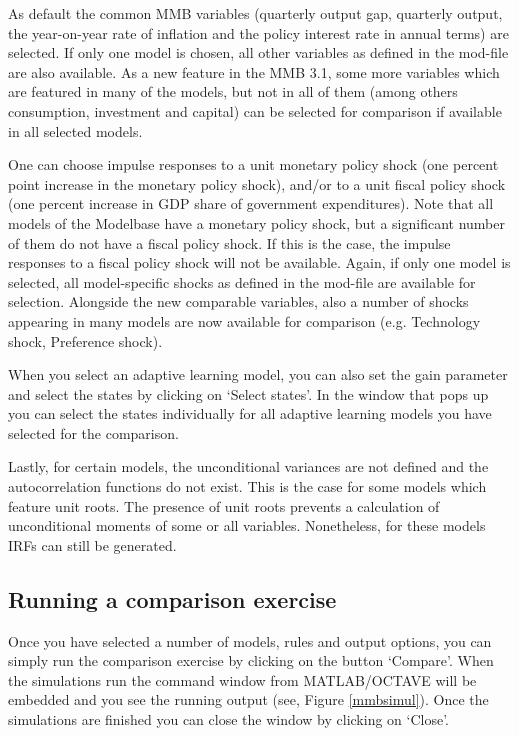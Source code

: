 As default the common MMB variables (quarterly output gap, quarterly output, the year-on-year rate of inflation and the policy interest rate in annual terms) are selected. If only one model is chosen, all other variables as defined in the mod-file are also available. As a new feature in the MMB 3.1, some more variables which are featured in many of the models, but not in all of them  (among others consumption, investment and capital) can be selected for comparison if available in all selected models. 

One can choose impulse responses to a unit monetary policy shock (one percent point increase in the monetary policy shock), and/or to a unit fiscal policy shock (one percent increase in GDP share of government expenditures). Note that all models of the Modelbase have a monetary policy shock, but a significant number of them do not have a fiscal policy shock. If this is the case, the impulse responses to a fiscal policy shock will not be available. Again, if only one model is selected, all model-specific shocks as defined in the mod-file are available for selection. Alongside the new comparable variables, also a number of shocks  appearing in many models are now available for comparison (e.g. Technology shock, Preference shock).

When you select an adaptive learning model, you can also set the gain parameter and select the states by clicking on `Select states'. In the window that pops up you can select the states individually for all adaptive learning models you have selected for the comparison.

Lastly, for certain models, the unconditional variances are not defined and the autocorrelation functions do not exist. This is the case for some models which feature unit roots. The presence of unit roots prevents a calculation of unconditional moments of some or all variables. Nonetheless, for these models IRFs can still be generated. 

\subsection*{Running a comparison exercise}
Once you have selected a number of models, rules and output options, you can simply run the comparison exercise by clicking on the button `Compare'. When the simulations run the command window from MATLAB/OCTAVE will be embedded and you see the running output (see, Figure \ref{mmbsimul}). Once the simulations are finished you can close the window by clicking on `Close'.
 
